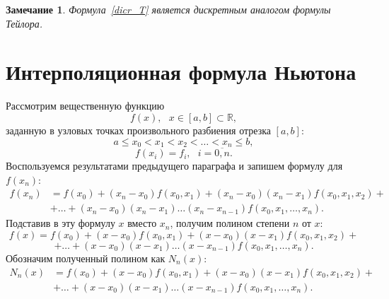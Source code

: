 \documentclass[11pt,a4paper,twoside]{report}
\numberwithin{equation}{section}
\theoremstyle{definition}
\theoremstyle{plain}
\newtheorem*{note*}{Замечание}
\begin{document}
%
\begin{note*}
%
    Формула~\eqref{dicr_T} является дискретным аналогом формулы Тейлора.
%
\end{note*}

%
\section{Интерполяционная формула Ньютона}
%
Рассмотрим вещественную функцию
%
$$
    f(x), ~~~x\in[a,b]\subset\mathbb{R},
$$
%
заданную в узловых точках произвольного разбиения отрезка $[a,b]$:
%
$$
    a\leqslant x_0<x_1<x_2<\ldots<x_n\leqslant b,
$$
%
%
$$
    f(x_i) = f_i, ~~~ i=\overline{0, n}.
$$
%
Воспользуемся результатами предыдущего параграфа и запишем формулу для $f(x_n)$:
%
\begin{equation}
%
    \label{New_Poly}
    \begin{split}
        f(x_n)&=f(x_0)+(x_n-x_0)f(x_0,x_1)+(x_n-x_0)(x_n-x_1)f(x_0,x_1,x_2)+ \\
        &+\ldots+(x_n-x_0)(x_n-x_1)\ldots(x_n-x_{n-1})f(x_0,x_1,\ldots,x_n).
    \end{split}
%
\end{equation}
%
Подставив в эту формулу $x$ вместо $x_n$, получим полином
степени $n$ от $x$:
%
$$
    f(x)=f(x_0)+(x-x_0)f(x_0,x_1)+(x-x_0)(x-x_1)f(x_0,x_1,x_2)+
$$
%
$$
    +\ldots+(x-x_0)(x-x_1)\ldots(x-x_{n-1})f(x_0,x_1,\ldots,x_n).
$$
%
Обозначим полученный полином как $N_n(x)$:
%
\begin{equation}
%
    \label{Poly_N}
    \begin{split}
        N_n(x)&=f(x_0)+(x-x_0)f(x_0,x_1)+(x-x_0)(x-x_1)f(x_0,x_1,x_2)+ \\
        &+\ldots+(x-x_0)(x-x_1)\ldots(x-x_{n-1})f(x_0,x_1,\ldots,x_n).
    \end{split}
%
\end{equation}
%
%
\end{document}
